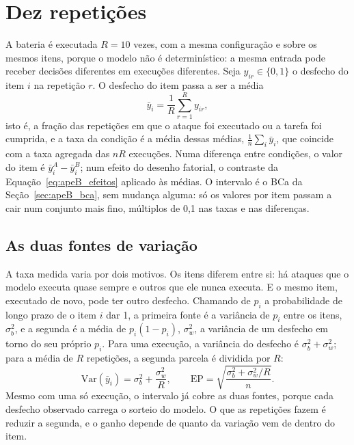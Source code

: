 \section{Dez repetições}\label{sec:apeB_repeticoes}

A bateria é executada $R = 10$ vezes, com a mesma configuração e sobre os
mesmos itens, porque o modelo não é determinístico: a mesma entrada pode
receber decisões diferentes em execuções diferentes. Seja
$y_{ir} \in \{0, 1\}$ o desfecho do item $i$ na repetição $r$. O desfecho do
item passa a ser a média
\begin{equation}
\bar y_i = \frac{1}{R}\sum_{r=1}^{R} y_{ir},
\label{eq:apeB_media}
\end{equation}
isto é, a fração das repetições em que o ataque foi executado ou a tarefa foi
cumprida, e a taxa da condição é a média dessas médias,
$\frac{1}{n}\sum_i \bar y_i$, que coincide com a taxa agregada das $nR$
execuções. Numa diferença entre condições, o valor do item é
$\bar y_i^{A} - \bar y_i^{B}$; num efeito do desenho fatorial, o contraste da
Equação~\eqref{eq:apeB_efeitos} aplicado às médias. O intervalo é o BCa da
Seção~\ref{sec:apeB_bca}, sem mudança alguma: só os valores por item passam a
cair num conjunto mais fino, múltiplos de 0,1 nas taxas e nas diferenças.

\subsection*{As duas fontes de variação}

A taxa medida varia por dois motivos. Os itens diferem entre si: há ataques
que o modelo executa quase sempre e outros que ele nunca executa. E o mesmo
item, executado de novo, pode ter outro desfecho. Chamando de $p_i$ a
probabilidade de longo prazo de o item $i$ dar 1, a primeira fonte é a
variância de $p_i$ entre os itens, $\sigma_b^2$, e a segunda é a média de
$p_i(1 - p_i)$, $\sigma_w^2$, a variância de um desfecho em torno do seu
próprio $p_i$. Para uma execução, a variância do desfecho é
$\sigma_b^2 + \sigma_w^2$; para a média de $R$ repetições, a segunda parcela é
dividida por $R$:
\begin{equation}
\mathrm{Var}(\bar y_i) = \sigma_b^2 + \frac{\sigma_w^2}{R}, \qquad
\mathrm{EP} = \sqrt{\frac{\sigma_b^2 + \sigma_w^2/R}{n}}.
\label{eq:apeB_decomp}
\end{equation}
Mesmo com uma só execução, o intervalo já cobre as duas fontes, porque cada
desfecho observado carrega o sorteio do modelo. O que as repetições fazem é
reduzir a segunda, e o ganho depende de quanto da variação vem de dentro do
item.

